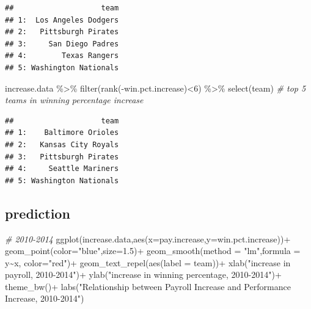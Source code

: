 \documentclass[
  12pt,
]{article}
\newenvironment{Shaded}{\begin{snugshade}}{\end{snugshade}}
\newcommand{\AttributeTok}[1]{\textcolor[rgb]{0.77,0.63,0.00}{#1}}
\newcommand{\CommentTok}[1]{\textcolor[rgb]{0.56,0.35,0.01}{\textit{#1}}}
\newcommand{\DecValTok}[1]{\textcolor[rgb]{0.00,0.00,0.81}{#1}}
\newcommand{\FloatTok}[1]{\textcolor[rgb]{0.00,0.00,0.81}{#1}}
\newcommand{\FunctionTok}[1]{\textcolor[rgb]{0.00,0.00,0.00}{#1}}
\newcommand{\NormalTok}[1]{#1}
\newcommand{\SpecialCharTok}[1]{\textcolor[rgb]{0.00,0.00,0.00}{#1}}
\newcommand{\StringTok}[1]{\textcolor[rgb]{0.31,0.60,0.02}{#1}}
\begin{document}
\begin{verbatim}
##                    team
## 1:  Los Angeles Dodgers
## 2:   Pittsburgh Pirates
## 3:     San Diego Padres
## 4:        Texas Rangers
## 5: Washington Nationals
\end{verbatim}

\begin{Shaded}
\begin{Highlighting}[]
\NormalTok{increase.data }\SpecialCharTok{\%\textgreater{}\%}
  \FunctionTok{filter}\NormalTok{(}\FunctionTok{rank}\NormalTok{(}\SpecialCharTok{{-}}\NormalTok{win.pct.increase)}\SpecialCharTok{\textless{}}\DecValTok{6}\NormalTok{) }\SpecialCharTok{\%\textgreater{}\%}
  \FunctionTok{select}\NormalTok{(team) }\CommentTok{\# top 5 teams in winning percentage increase}
\end{Highlighting}
\end{Shaded}

\begin{verbatim}
##                    team
## 1:    Baltimore Orioles
## 2:   Kansas City Royals
## 3:   Pittsburgh Pirates
## 4:     Seattle Mariners
## 5: Washington Nationals
\end{verbatim}

\hypertarget{prediction}{%
\subsection{prediction}\label{prediction}}

\begin{Shaded}
\begin{Highlighting}[]
\CommentTok{\# 2010{-}2014}
\FunctionTok{ggplot}\NormalTok{(increase.data,}\FunctionTok{aes}\NormalTok{(}\AttributeTok{x=}\NormalTok{pay.increase,}\AttributeTok{y=}\NormalTok{win.pct.increase))}\SpecialCharTok{+}
  \FunctionTok{geom\_point}\NormalTok{(}\AttributeTok{color=}\StringTok{"blue"}\NormalTok{,}\AttributeTok{size=}\FloatTok{1.5}\NormalTok{)}\SpecialCharTok{+}
  \FunctionTok{geom\_smooth}\NormalTok{(}\AttributeTok{method =} \StringTok{"lm"}\NormalTok{,}\AttributeTok{formula =}\NormalTok{ y}\SpecialCharTok{\textasciitilde{}}\NormalTok{x, }\AttributeTok{color=}\StringTok{"red"}\NormalTok{)}\SpecialCharTok{+}
  \FunctionTok{geom\_text\_repel}\NormalTok{(}\FunctionTok{aes}\NormalTok{(}\AttributeTok{label =}\NormalTok{ team))}\SpecialCharTok{+}
  \FunctionTok{xlab}\NormalTok{(}\StringTok{"increase in payroll, 2010{-}2014"}\NormalTok{)}\SpecialCharTok{+}
  \FunctionTok{ylab}\NormalTok{(}\StringTok{"increase in winning percentage, 2010{-}2014"}\NormalTok{)}\SpecialCharTok{+}
  \FunctionTok{theme\_bw}\NormalTok{()}\SpecialCharTok{+}
  \FunctionTok{labs}\NormalTok{(}\StringTok{"Relationship between Payroll Increase and Performance Increase, 2010{-}2014"}\NormalTok{)}
\end{Highlighting}
\end{Shaded}
\end{document}
